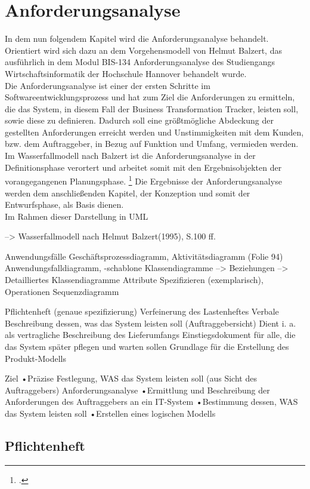 \section{Anforderungsanalyse}
In dem nun folgendem Kapitel wird die Anforderungsanalyse behandelt. Orientiert wird sich dazu an dem Vorgehensmodell von Helmut Balzert, das ausführlich in dem Modul BIS-134 Anforderungsanalyse des Studiengangs Wirtschaftsinformatik der Hochschule Hannover behandelt wurde.\\Die Anforderungsanalyse ist einer der ersten Schritte im Softwareentwicklungsprozess und hat zum Ziel die Anforderungen zu ermitteln, die das System, in diesem Fall der Business Transformation Tracker, leisten soll, sowie diese zu definieren. Dadurch soll eine größtmögliche Abdeckung der gestellten Anforderungen erreicht werden und Unstimmigkeiten mit dem Kunden, bzw. dem Auftraggeber, in Bezug auf Funktion und Umfang, vermieden werden. Im Wasserfallmodell nach Balzert ist die Anforderungsanalyse in der Definitionsphase verortert und arbeitet somit mit den Ergebnisobjekten der vorangegangenen Planungsphase. \footcite[Vgl.][S. 100 ff.]{balzert} Die Ergebnisse der Anforderungsanalyse werden dem anschließenden Kapitel, der Konzeption und somit der Entwurfsphase, als Basis dienen.\\
Im Rahmen dieser    Darstellung in UML


--> Wasserfallmodell nach Helmut Balzert(1995), S.100 ff.

Anwendungsfälle
Geschäftsprozessdiagramm, Aktivitätsdiagramm (Folie 94)
Anwendungsfalldiagramm, -schablone
Klassendiagramme --> Beziehungen --> Detailliertes Klassendiagramme
Attribute Spezifizieren (exemplarisch), Operationen
Sequenzdiagramm

Pflichtenheft (genaue spezifizierung) 
Verfeinerung des Lastenheftes
Verbale Beschreibung dessen, was das System leisten soll (Auftraggebersicht)
Dient i. a. als vertragliche Beschreibung des Lieferumfangs
Einstiegsdokument für alle, die das System später pflegen und warten sollen
Grundlage für die Erstellung des Produkt-Modells

Ziel
•Präzise Festlegung, WAS das System leisten soll (aus Sicht des Auftraggebers)
Anforderungsanalyse
•Ermittlung und Beschreibung der Anforderungen des Auftraggebers an ein IT-System
•Bestimmung dessen, WAS das System leisten soll
•Erstellen eines logischen Modells

\subsection{Pflichtenheft}
